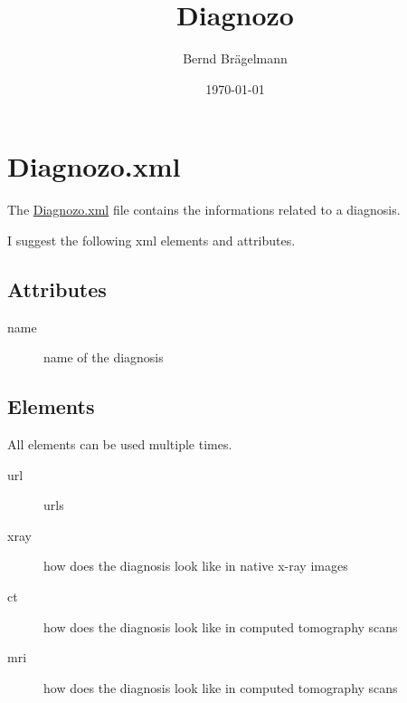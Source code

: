 \documentclass{article}
\title{Diagnozo}
\author{Bernd Brägelmann}
\date{\today}
\begin{document}
\maketitle
\tableofcontents

\section{Diagnozo.xml}
The \href{https://github.com/braegel/Diagnozo/blob/master/diagnozo.xml}{Diagnozo.xml} file contains the informations related to a diagnosis.

I suggest the following xml elements and attributes.

\subsection{Attributes}

\begin{description}
	\item[name] name of the diagnosis
\end{description}

\subsection{Elements}
All elements can be used multiple times.

\begin{description}
	\item[url] urls
	\item[xray] how does the diagnosis look like in native x-ray images
	\item[ct] how does the diagnosis look like in computed tomography scans
	\item[mri] how does the diagnosis look like in computed tomography scans
\end{description}
\end{document}
